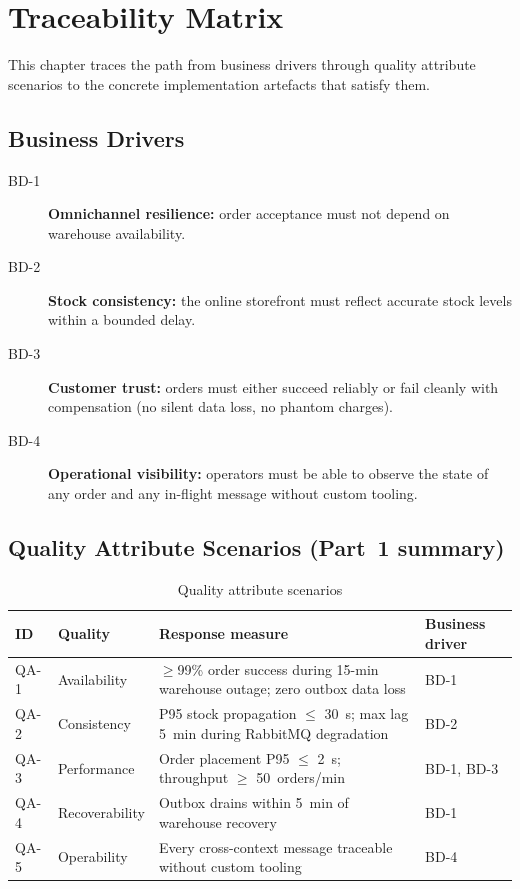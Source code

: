 \chapter{Traceability Matrix}
\label{ch:traceability}

This chapter traces the path from business drivers through quality attribute scenarios to the concrete implementation artefacts that satisfy them.

\section{Business Drivers}

\begin{description}
    \item[BD-1] \textbf{Omnichannel resilience:} order acceptance must not depend on warehouse availability.
    \item[BD-2] \textbf{Stock consistency:} the online storefront must reflect accurate stock levels within a bounded delay.
    \item[BD-3] \textbf{Customer trust:} orders must either succeed reliably or fail cleanly with compensation (no silent data loss, no phantom charges).
    \item[BD-4] \textbf{Operational visibility:} operators must be able to observe the state of any order and any in-flight message without custom tooling.
\end{description}

\section{Quality Attribute Scenarios (Part~1 summary)}

\begin{table}[H]
\centering
\caption{Quality attribute scenarios}
\label{tab:qa-scenarios}
\begin{tabularx}{\textwidth}{@{} C{1.2cm} L{2.8cm} X L{3.2cm} @{}}
\toprule
\textbf{ID} & \textbf{Quality} & \textbf{Response measure} & \textbf{Business driver} \\
\midrule
QA-1 & Availability & $\geq$99\% order success during 15-min warehouse outage; zero outbox data loss & BD-1 \\
QA-2 & Consistency & P95 stock propagation $\leq$ 30~s; max lag 5~min during RabbitMQ degradation & BD-2 \\
QA-3 & Performance & Order placement P95 $\leq$ 2~s; throughput $\geq$ 50~orders/min & BD-1, BD-3 \\
QA-4 & Recoverability & Outbox drains within 5~min of warehouse recovery & BD-1 \\
QA-5 & Operability & Every cross-context message traceable without custom tooling & BD-4 \\
\bottomrule
\end{tabularx}
\end{table}

